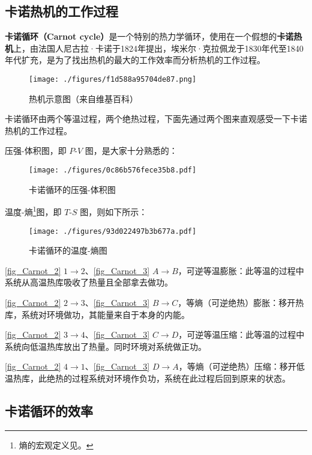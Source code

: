 
\subsection{卡诺热机的工作过程}
\textbf{卡诺循环（Carnot cycle）}是一个特别的热力学循环，使用在一个假想的\textbf{卡诺热机}上，由法国人尼古拉·卡诺于1824年提出，埃米尔·克拉佩龙于1830年代至1840年代扩充，是为了找出热机的最大的工作效率而分析热机的工作过程。

\begin{figure}[ht]
\centering
\texttt{[image: ./figures/f1d588a95704de87.png]}
\caption{热机示意图（来自维基百科）} \label{fig_Carnot_1}
\end{figure}
卡诺循环由两个等温过程，两个绝热过程，下面先通过两个图来直观感受一下卡诺热机的工作过程。

压强-体积图，即 $P$-$V$ 图，是大家十分熟悉的：
\begin{figure}[ht]
\centering
\texttt{[image: ./figures/0c86b576fece35b8.pdf]}
\caption{卡诺循环的压强-体积图} \label{fig_Carnot_2}
\end{figure}
温度-熵\footnote{熵的宏观定义见。}图，即 $T$-$S$ 图，则如下所示：
\begin{figure}[ht]
\centering
\texttt{[image: ./figures/93d022497b3b677a.pdf]}
\caption{卡诺循环的温度-熵图} \label{fig_Carnot_3}
\end{figure}

\autoref{fig_Carnot_2} $1\to 2$、\autoref{fig_Carnot_3} $A\to B$，可逆等温膨胀：此等温的过程中系统从高温热库吸收了热量且全部拿去做功。

\autoref{fig_Carnot_2} $2\to 3$、\autoref{fig_Carnot_3} $B\to C$，等熵（可逆绝热）膨胀：移开热库，系统对环境做功，其能量来自于本身的内能。

\autoref{fig_Carnot_2} $3\to 4$、\autoref{fig_Carnot_3} $C\to D$，可逆等温压缩：此等温的过程中系统向低温热库放出了热量。同时环境对系统做正功。

\autoref{fig_Carnot_2} $4\to 1$、\autoref{fig_Carnot_3} $D\to A$，等熵（可逆绝热）压缩：移开低温热库，此绝热的过程系统对环境作负功，系统在此过程后回到原来的状态。

\subsection{卡诺循环的效率}

